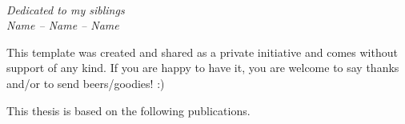 \documentclass[11pt]{book}
\begin{document}


\newpage
\thispagestyle{empty} %
~
\vspace{140pt}
\begin{flushright}
  \textit{Dedicated to my siblings\\Name -- Name -- Name}
\end{flushright}

\cleardoublepage

\setcounter{page}{1} %
\setcounter{tocdepth}{1}

\tableofcontents
{}


\newpage


\thispagestyle{fancyplain}

This template was created and shared as a private initiative and comes without
support of any kind. If you are happy to have it, you are welcome to say thanks
and/or to send beers/goodies! :)

\newpage


\thispagestyle{fancyplain} %



This thesis is based on the following publications.


\begin{description}[leftmargin=!,labelwidth=0.7cm]
  \item[\I]  
  \item[\II] 
  \item[\III] 
  \item[\IV] 
  \item[\V] 
\end{description}
\end{document}
